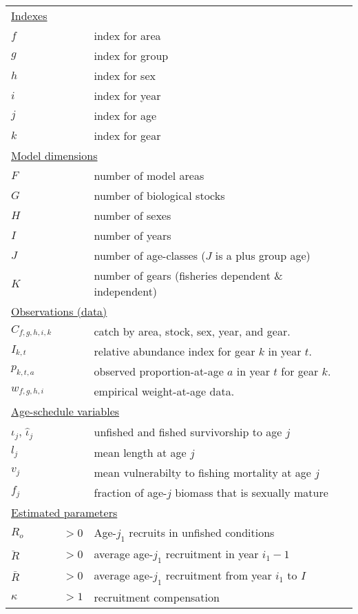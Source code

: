 \begin{center}
\begin{longtable}{lll}
\multicolumn{3}{l}{\underline{Indexes}}\\
$f$ & & index for area  \\      
$g$ & & index for group \\      
$h$ & & index for sex   \\      
$i$ & & index for year  \\      
$j$ & & index for age   \\      
$k$ & & index for gear  \\      
\multicolumn{3}{l}{\underline{Model dimensions}}\\
$F$ &  & number of model areas\\
$G$ &  & number of biological stocks \\
$H$ &  & number of sexes \\
$I$ &  & number of years\\
$J$ &  & number of age-classes ($J$ is a plus group age)\\
$K$ &  & number of gears (fisheries dependent \& independent)\\
\multicolumn{3}{l}{\underline{Observations (data)}}\\
$C_{f,g,h,i,k}$       & & catch by area, stock, sex, year, and gear.\\
$I_{k,t}$       & & relative abundance index for gear $k$ in year $t$.\\
$p_{k,t,a}$     & & observed proportion-at-age $a$ in year $t$ for gear $k$.\\
$w_{f,g,h,i}$   & & empirical weight-at-age data.\\
\multicolumn{3}{l}{\underline{Age-schedule variables}}\\
$\iota_j$, $\hat{\iota}_j$ && unfished and fished survivorship to age $j$\\
$l_j$ && mean length at age $j$\\
$v_j$ && mean vulnerabilty to fishing mortality at age $j$ \\
$f_j$ && fraction of age-$j$ biomass that is sexually mature\\
\multicolumn{3}{l}{\underline{Estimated parameters}}\\
$R_o$               & $> 0$& Age-${j}_1$ recruits in unfished conditions\\
$\ddot{R}$          & $> 0$& average age-${j}_1$ recruitment in year $i_1-1$\\
$\bar{R}$           & $> 0$& average age-${j}_1$ recruitment from year $i_1$ to $I$\\
$\kappa$            & $> 1$& recruitment compensation\\

\end{longtable}
\end{center}
